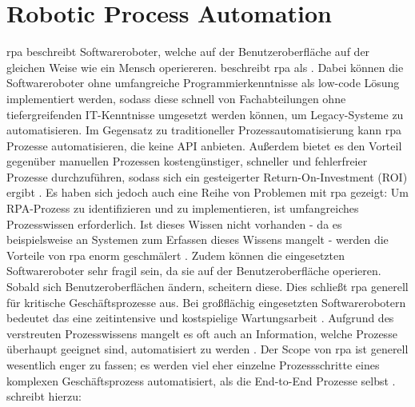     \section{Robotic Process Automation} \label{rpa}
    \gls{rpa} beschreibt Softwareroboter, welche auf der Benutzeroberfläche auf der gleichen Weise wie ein Mensch operiereren. \citet{vanderAalst2018} beschreibt \gls{rpa} als . Dabei können die Softwareroboter ohne umfangreiche Programmierkenntnisse als low-code Lösung implementiert werden, sodass diese schnell von Fachabteilungen ohne tiefergreifenden IT-Kenntnisse umgesetzt werden können, um Legacy-Systeme zu automatisieren. Im Gegensatz zu traditioneller Prozessautomatisierung kann \gls{rpa} Prozesse automatisieren, die keine API anbieten. Außerdem bietet es den Vorteil gegenüber manuellen Prozessen kostengünstiger, schneller und fehlerfreier Prozesse durchzuführen, sodass sich ein gesteigerter Return-On-Investment (ROI) ergibt \citep{Kroll2017}. Es haben sich jedoch auch eine Reihe von Problemen mit \gls{rpa} gezeigt: Um RPA-Prozess zu identifizieren und zu implementieren, ist umfangreiches Prozesswissen erforderlich. Ist dieses Wissen nicht vorhanden - da es beispielsweise an Systemen zum Erfassen dieses Wissens mangelt - werden die Vorteile von \gls{rpa} enorm geschmälert \citep[S.4f]{König2020RPA-BPMS}. Zudem können die eingesetzten Softwareroboter sehr fragil sein, da sie auf der Benutzeroberfläche operieren. Sobald sich Benutzeroberflächen ändern, scheitern diese. Dies schließt \gls{rpa} generell für kritische Geschäftsprozesse aus. Bei großflächig eingesetzten Softwarerobotern bedeutet das eine zeitintensive und kostspielige Wartungsarbeit \citep{Ruha2023}. Aufgrund des verstreuten Prozesswissens mangelt es oft auch an Information, welche Prozesse überhaupt geeignet sind, automatisiert zu werden \citep{Greene2019}. Der Scope von \gls{rpa} ist generell wesentlich enger zu fassen; es werden viel eher einzelne Prozessschritte eines komplexen Geschäftsprozess automatisiert, als die End-to-End Prozesse selbst \citep{Signavio2019}. \citet[S. 3]{König2020RPA-BPMS} schreibt hierzu: 

